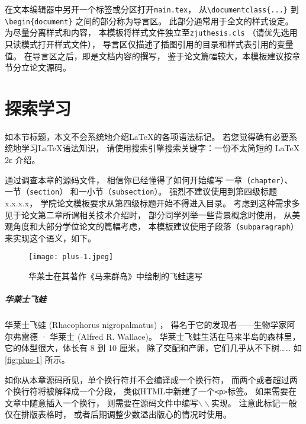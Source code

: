 在文本编辑器中另开一个标签或分区打开\texttt{main.tex}，
从\texttt{\textbackslash documentclass\{...\}}
到\texttt{\textbackslash begin\{document\}}
之间的部分称为导言区。
此部分通常用于全文的样式设定。
为尽量分离样式和内容，
本模板将样式文件独立至\texttt{zjuthesis.cls}
（请优先选用只读模式打开样式文件），
导言区仅描述了插图引用的目录和样式表引用的变量值。
在导言区之后，即是文档内容的撰写，
鉴于论文篇幅较大，本模板建议按章节分立论文源码。

\section{探索学习}
如本节标题，本文不会系统地介绍\LaTeX 的各项语法标记。
若您觉得确有必要系统地学习\LaTeX 语法知识，
请使用搜索引擎搜索关键字：一份不太简短的 LaTeX 2ε 介绍。

通过调查本章的源码文件，
相信你已经懂得了如何开始编写
一章（\texttt{chapter}）、
一节（\texttt{section}）
和一小节（\texttt{subsection}）。
强烈不建议使用到第四级标题x.x.x.x，
学院论文模板要求从第四级标题开始不得进入目录。
考虑到这种需求多见于论文第二章所谓相关技术介绍时，
部分同学列举一些背景概念时使用，
从美观角度和大部分学位论文的篇幅考虑，
本模板建议使用子段落（\texttt{subparagraph}）来实现这个语义，如下。

\begin{figure}[htbp]
    \centering  %
    \texttt{[image: plus-1.jpeg]} %
    \caption{华莱士在其著作《马来群岛》中绘制的飞蛙速写} %
    \label{fig:plus-1} %
\end{figure}


\subparagraph{华莱士飞蛙}
华莱士飞蛙 (Rhacophorus nigropalmatus) ，
得名于它的发现者——生物学家阿尔弗雷德 · 华莱士 (Alfred R. Wallace)。
华莱士飞蛙生活在马来半岛的森林里，
它的体型很大，体长有 8 到 10 厘米，
除了交配和产卵，它们几乎从不下树……
如\autoref{fig:plus-1} 所示。

如你从本章源码所见，单个换行符并不会编译成一个换行符，
而两个或者超过两个换行符将被解释成一个分段，
类似HTML中新建了一个\texttt{<p>}标签。
如果需要在文章中随意插入一个换行，
则需要在源码文件中编写$\backslash\backslash$实现。
注意此标记一般仅在排版表格时，
或者后期调整少数溢出版心的情况时使用。

